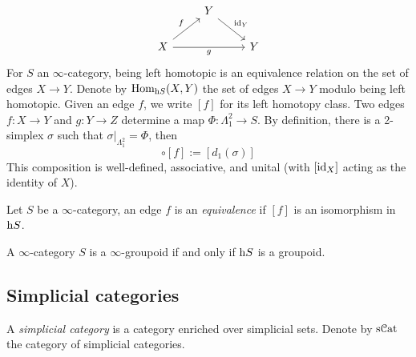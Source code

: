 \documentclass[10pt]{amsart}
\numberwithin{equation}{section}
\begin{document}
\begin{equation}
    \begin{tikzcd}
      & Y \arrow[dr,"\id_Y"] & \\
      X \arrow[ru,"f"] \arrow[rr,"g"'] & {} & Y 
    \end{tikzcd}
\end{equation}For $S$ an $\infty$-category, being left homotopic is an equivalence relation on the set of edges $X\to Y$. Denote by $\mathrm{Hom}_{\mathrm{h} S}(X,Y)$ the set of edges $X\to Y$ modulo being left homotopic. Given an edge $f$, we write $[f]$ for its left homotopy class. Two edges $f:X\to Y$ and $g:Y\to Z$ determine a map $\Phi:\Lambda^2_1\to S$. By definition, there is a 2-simplex $\sigma$ such that $\sigma|_{\Lambda^2_1}=\Phi$, then \begin{equation}
  [g]\circ[f]:=[d_1(\sigma)]
\end{equation}
This composition is well-defined, associative, and unital (with $[\mathrm{id}_X]$ acting as the identity of $X$). 
\begin{definition}
  Let $S$ be a $\infty$-category, an edge $f$ is an \emph{equivalence} if $[f]$ is an isomorphism in $\mathrm{h} S$.
\end{definition}
\begin{theorem}
  A $\infty$-category $S$ is a $\infty$-groupoid if and only if $\mathrm{h} S$ is a groupoid. 
\end{theorem}

\subsection{Simplicial categories}

\begin{definition}
  A \emph{simplicial category} is a category enriched over simplicial sets. Denote by $\mathrm{s}\mathcal{C}\mathrm{at}$ the category of simplicial categories. 
\end{definition}

\end{document}
